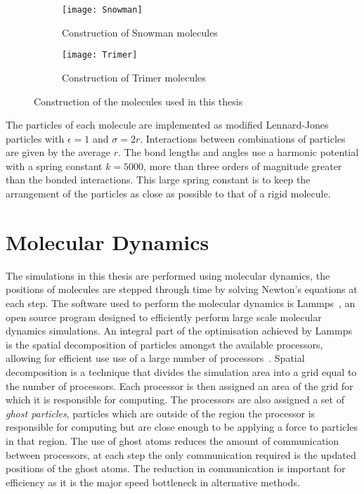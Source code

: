 \begin{figure}
    \begin{subfigure}{0.5\textwidth}
        \centering
        \texttt{[image: Snowman]}
        \caption{Construction of Snowman molecules}
        \label{fig:snowman}
    \end{subfigure}
    \begin{subfigure}{0.5\textwidth}
        \centering
        \texttt{[image: Trimer]}
        \caption{Construction of Trimer molecules}
        \label{fig:trimer}
    \end{subfigure}
    \caption{Construction of the molecules used in this thesis}
    \label{fig:construction}
\end{figure}

The particles of each molecule are implemented as modified Lennard-Jones particles with $\epsilon = 1$ and $\sigma = 2r$. Interactions between combinations of particles are given by the average $r$. The bond lengths and angles use a harmonic potential with a spring constant $k=5000$, more than three orders of magnitude greater than the bonded interactions. This large spring constant is to keep the arrangement of the particles as close as possible to that of a rigid molecule.

\section{Molecular Dynamics}

The simulations in this thesis are performed using molecular dynamics, the positions of molecules are stepped through time by solving Newton's equations at each step. The software used to perform the molecular dynamics is Lammps~\tocite, an open source program designed to efficiently perform large scale molecular dynamics simulations. An integral part of the optimisation achieved by Lammps is the spatial decomposition of particles amongst the available processors, allowing for efficient use use of a large number of processors~\tocite. Spatial decomposition is a technique that divides the simulation area into a grid equal to the number of processors. Each processor is then assigned an area of the grid for which it is responsible for computing. The processors are also assigned a set of \emph{ghost particles}, particles which are outside of the region the processor is responsible for computing but are close enough to be applying a force to particles in that region. The use of ghost atoms reduces the amount of communication between processors, at each step the only communication required is the updated positions of the ghost atoms. The reduction in communication is important for efficiency as it is the major speed bottleneck in alternative methods.

